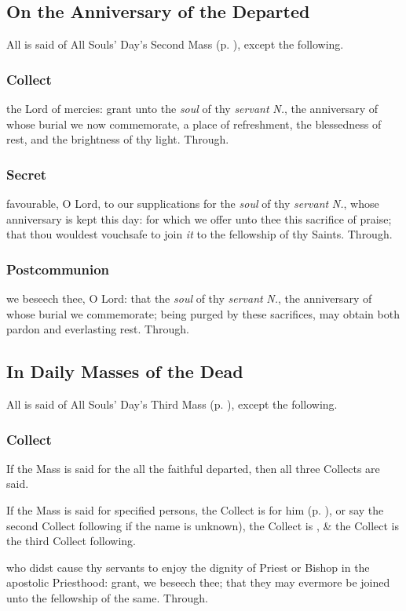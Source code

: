 \subsection{On the Anniversary of the Departed}
\begin{rubric}
    All is said of All Souls' Day's Second Mass (p. \pageref{AllSoulsII}), except the following.
\end{rubric}
\subsubsection{Collect}
 the Lord of mercies: grant unto the \textit{soul} of thy \textit{servant} \textit{N.}, the anniversary of whose burial we now commemorate, a place of refreshment, the blessedness of rest, and the brightness of thy light. Through.

\subsubsection{Secret}
 favourable, O Lord, to our supplications for the \textit{soul} of thy \textit{servant} \textit{N.}, whose anniversary is kept this day: for which we offer unto thee this sacrifice of praise; that thou wouldest vouchsafe to join \textit{it} to the fellowship of thy Saints. Through.

\subsubsection{Postcommunion}
 we beseech thee, O Lord: that the \textit{soul} of thy \textit{servant} \textit{N.}, the anniversary of whose burial we commemorate; being purged by these sacrifices, may obtain both pardon and everlasting rest. Through.

\subsection{In Daily Masses of the Dead}
\begin{rubric}
    All is said of All Souls' Day's Third Mass (p. \pageref{AllSoulsIII}), except the following.
\end{rubric}
\vspace{-0.5\baselineskip}
\subsubsection{Collect}
\begin{rubric}
    If the Mass is said for the all the faithful departed, then all three Collects are said.
\end{rubric}
\begin{rubric}
    If the Mass is said for specified persons, the  Collect is for him (p. \pageref{RequiemPrayers}), or say the second Collect following if the name is unknown), the  Collect is , \& the  Collect is the third Collect following.
\end{rubric}
 who didst cause thy servants to enjoy the dignity of Priest or Bishop in the apostolic Priesthood: grant, we beseech thee; that they may evermore be joined unto the fellowship of the same. Through.

